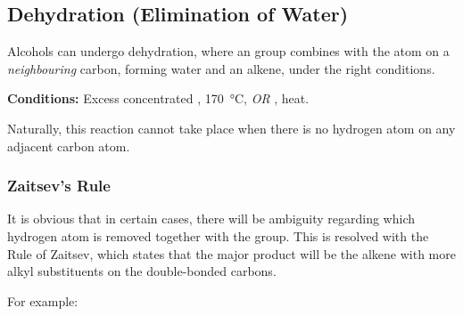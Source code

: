 

		\pagebreak
		\subsection{Dehydration (Elimination of Water)}

			Alcohols can undergo dehydration, where an  group combines with the  atom on a \textit{neighbouring} carbon, forming
			water and an alkene, under the right conditions.

			\vspace{1.5em}
			\vbox{\textbf{Conditions:}	\tabto{35mm}Excess concentrated , \SI{170}{\celsius}, \textit{OR}
										\tabto{35mm}, heat.}


			Naturally, this reaction cannot take place when there is no hydrogen atom on any adjacent carbon atom.

			\subsubsection{Zaitsev's Rule}

				It is obvious that in certain cases, there will be ambiguity regarding which hydrogen atom is removed together with the 
				group. This is resolved with the Rule of Zaitsev, which states that the major product will be the alkene with more alkyl
				substituents on the double-bonded carbons.

				For example:


